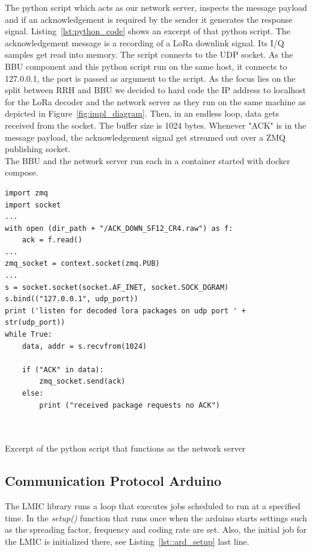The python script which acts as our network server, inspects the message payload and if an 
acknowledgement is required by the sender it generates the response signal. 
Listing~\ref{lst:python_code} shows an excerpt of that python script.
The acknowledgement message is a recording of a LoRa downlink signal. Its I/Q samples get read into memory.
The script connects to the UDP socket. As the BBU component and this python script run on the same host, it connects
to 127.0.0.1, the port is passed as argument to the script. As the focus lies on the split between RRH and BBU we decided
to hard code the IP address to localhost for the LoRa decoder and the network server as they run on the same machine as depicted 
in Figure~\ref{fig:impl_diagram}. 
Then, in an endless loop, data gets received from the socket. The buffer size is 1024 bytes.
Whenever "ACK" is in the message payload, the acknowledgement signal get streamed out over a ZMQ publishing socket.
\\
The BBU and the network server run each in a container started with docker compose.


\begin{listing}[H]
\begin{verbatim}
import zmq
import socket
...
with open (dir_path + "/ACK_DOWN_SF12_CR4.raw") as f:
    ack = f.read()
...
zmq_socket = context.socket(zmq.PUB)
...
s = socket.socket(socket.AF_INET, socket.SOCK_DGRAM)
s.bind(("127.0.0.1", udp_port))
print ('listen for decoded lora packages on udp port ' + str(udp_port))
while True:
    data, addr = s.recvfrom(1024)

    if ("ACK" in data):
        zmq_socket.send(ack) 
    else:
        print ("received package requests no ACK")
     
    
    \end{verbatim}
    \caption{Excerpt of the python script that functions as the network server}
    \label{lst:python_code}
\end{listing}

\subsection{Communication Protocol Arduino}
\label{sec:comm_prot}

The LMIC library runs a loop that executes jobs scheduled to run at a specified time. 
In the \emph{setup()} function that runs once when the arduino starts settings such as 
the spreading factor, frequency and coding rate are set. Also, the initial job for the LMIC is initialized there, see 
Listing~\ref{lst::ard_setup} last line.

